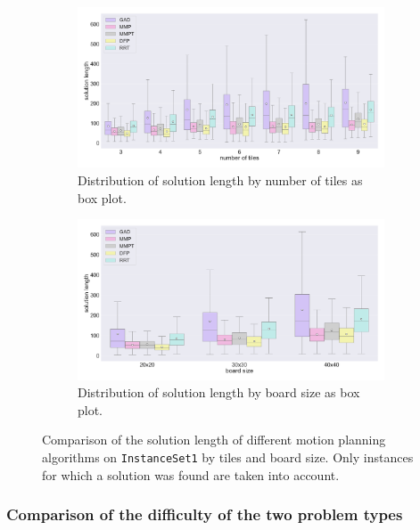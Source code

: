 \begin{figure}[htpb]
\begin{subfigure}[b]{\textwidth}
\centering
\includegraphics[width=\textwidth]{figures/plots/heuristic_solvers_i1/i1_solution_length_over_tiles.pdf}
\caption{Distribution of solution length by number of tiles as box plot.}
\label{fig:i1_solution_length_over_tiles}
\end{subfigure}
\begin{subfigure}[b]{\textwidth}
\centering
\includegraphics[width=\textwidth]{figures/plots/heuristic_solvers_i1/i1_solution_length_over_board_size.pdf}
\caption{Distribution of solution length by board size as box plot.}
\label{fig:i1_solution_length_over_board_size}
\end{subfigure}
\caption[Solution lengths for several planners on \texttt{InstanceSet1}]{Comparison of the solution length of different motion planning algorithms on \texttt{InstanceSet1} by tiles and board size. Only instances for which a solution was found are taken into account.}
\label{fig:i1_performance3}
\end{figure}

\vfill
\newpage

\subsubsection{Comparison of the difficulty of the two problem types}

